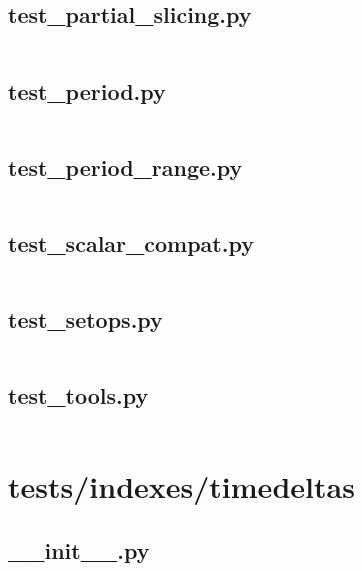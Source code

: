 \documentclass{article}
\begin{document}
\subsection{test\_partial\_slicing.py}
\inputminted{python}{/home/dufferzafar/dev/@clones/pandas/pandas/tests/indexes/period/test_partial_slicing.py}
\newpage

\subsection{test\_period.py}
\inputminted{python}{/home/dufferzafar/dev/@clones/pandas/pandas/tests/indexes/period/test_period.py}
\newpage

\subsection{test\_period\_range.py}
\inputminted{python}{/home/dufferzafar/dev/@clones/pandas/pandas/tests/indexes/period/test_period_range.py}
\newpage

\subsection{test\_scalar\_compat.py}
\inputminted{python}{/home/dufferzafar/dev/@clones/pandas/pandas/tests/indexes/period/test_scalar_compat.py}
\newpage

\subsection{test\_setops.py}
\inputminted{python}{/home/dufferzafar/dev/@clones/pandas/pandas/tests/indexes/period/test_setops.py}
\newpage

\subsection{test\_tools.py}
\inputminted{python}{/home/dufferzafar/dev/@clones/pandas/pandas/tests/indexes/period/test_tools.py}
\newpage

\section{tests/indexes/timedeltas}

\subsection{\_\_init\_\_.py}
\inputminted{python}{/home/dufferzafar/dev/@clones/pandas/pandas/tests/indexes/timedeltas/__init__.py}
\newpage
\end{document}
